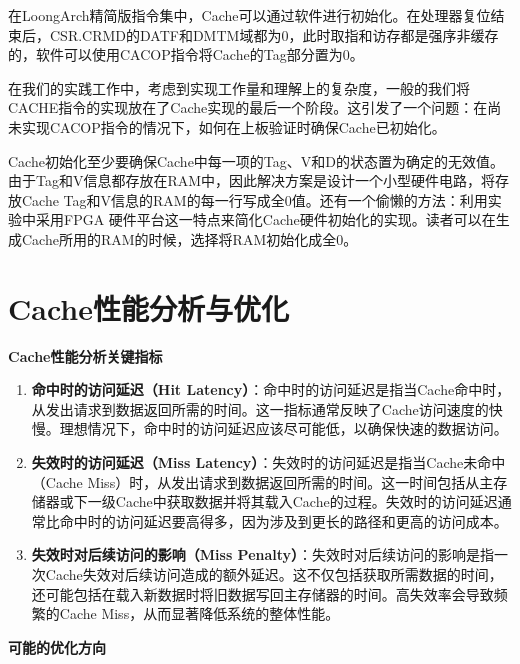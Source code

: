 在LoongArch精简版指令集中，Cache可以通过软件进行初始化。在处理器复位结束后，CSR.CRMD的DATF和DMTM域都为0，此时取指和访存都是强序非缓存的，软件可以使用CACOP指令将Cache的Tag部分置为0。

在我们的实践工作中，考虑到实现工作量和理解上的复杂度，一般的我们将CACHE指令的实现放在了Cache实现的最后一个阶段。这引发了一个问题：在尚未实现CACOP指令的情况下，如何在上板验证时确保Cache已初始化。

Cache初始化至少要确保Cache中每一项的Tag、V和D的状态置为确定的无效值。由于Tag和V信息都存放在RAM中，因此解决方案是设计一个小型硬件电路，将存放Cache Tag和V信息的RAM的每一行写成全0值。还有一个偷懒的方法：利用实验中采用FPGA 硬件平台这一特点来简化Cache硬件初始化的实现。读者可以在生成Cache所用的RAM的时候，选择将RAM初始化成全0。

\section{Cache性能分析与优化}\label{sec:09-cache-020}

\textbf{Cache性能分析关键指标}

\begin{enumerate}
\def\labelenumi{\arabic{enumi}.}
\item
  \textbf{命中时的访问延迟（Hit Latency）}：命中时的访问延迟是指当Cache命中时，从发出请求到数据返回所需的时间。这一指标通常反映了Cache访问速度的快慢。理想情况下，命中时的访问延迟应该尽可能低，以确保快速的数据访问。
\item
  \textbf{失效时的访问延迟（Miss Latency）}：失效时的访问延迟是指当Cache未命中（Cache Miss）时，从发出请求到数据返回所需的时间。这一时间包括从主存储器或下一级Cache中获取数据并将其载入Cache的过程。失效时的访问延迟通常比命中时的访问延迟要高得多，因为涉及到更长的路径和更高的访问成本。
\item
  \textbf{失效时对后续访问的影响（Miss Penalty）}：失效时对后续访问的影响是指一次Cache失效对后续访问造成的额外延迟。这不仅包括获取所需数据的时间，还可能包括在载入新数据时将旧数据写回主存储器的时间。高失效率会导致频繁的Cache Miss，从而显著降低系统的整体性能。
\end{enumerate}

\textbf{可能的优化方向}

